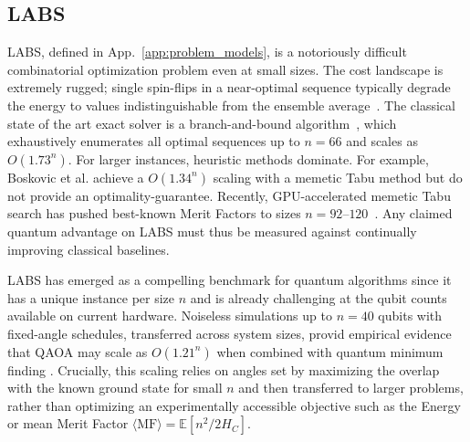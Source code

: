 \documentclass[twocolumn,
english,
aps,
pra,
10pt,
longbibliography,
superscriptaddress,
amsmath,
amssymb,
floatfix
]{revtex4-2}
\begin{document}
{\subsection{LABS\label{app:labs}}

LABS, defined in App.~\ref{app:problem_models}, is a notoriously difficult combinatorial optimization problem even at small sizes. 
The cost landscape is extremely rugged; single spin-flips in a near-optimal sequence typically degrade the energy to values indistinguishable from the ensemble average~\cite{bernasconi1987, Mertens_1996}. 
The classical state of the art exact solver is a branch-and-bound algorithm~\cite{Packebusch_2016}, which exhaustively enumerates all optimal sequences up to $n = 66$ and scales as $O(1.73^n)$. 
For larger instances, heuristic methods dominate.
For example, Boskovic et al. \cite{Bo_kovi__2017} achieve a $O(1.34^n)$ scaling with a memetic Tabu method but do not provide an optimality-guarantee.
Recently, GPU-accelerated memetic Tabu search has pushed best-known Merit Factors to sizes $n = 92$--$120$~\cite{zhang2025}. 
Any claimed quantum advantage on LABS must thus be measured against continually improving classical baselines.

LABS has emerged as a compelling benchmark for quantum algorithms \cite{koch2025quantum, Shaydulin2024, apte2025, sciorilli2026competitivenisqqubitefficientsolver, cadavid2025scalingadvantagequantumenhancedmemetic} since it has a unique instance per size $n$ and is already challenging at the qubit counts available on current hardware.
Noiseless simulations up to $n = 40$ qubits with fixed-angle schedules, transferred across system sizes, provid empirical evidence that QAOA may scale as $O(1.21^n)$ when combined with quantum minimum finding \cite{Shaydulin2024, vanApeldoorn2020quantumsdpsolvers, durr1996quantum}. 
Crucially, this scaling relies on angles set by maximizing the overlap with the known ground state for small $n$ and then transferred to larger problems, rather than optimizing an experimentally accessible objective such as the Energy or mean Merit Factor $\langle \text{MF} \rangle = \mathbb{E}[n^2 / 2 H_C]$. 

}
\end{document}
